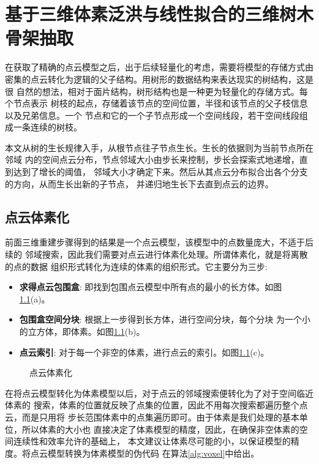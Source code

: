 \chapter{基于三维体素泛洪与线性拟合的三维树木骨架抽取}
\label{sec:sklextract}
在获取了精确的点云模型之后，出于后续轻量化的考虑，需要将模型的存储方式由
密集的点云转化为逻辑的父子结构。用树形的数据结构来表达现实的树结构，这是很
自然的想法，相对于面片结构，树形结构也是一种更为轻量化的存储方式。每个节点表示
树枝的起点，存储着该节点的空间位置，半径和该节点的父子枝信息以及兄弟信息。一个
节点和它的一个子节点形成一个空间线段，若干空间线段组成一条连续的树枝。

本文从树的生长规律入手，从根节点往子节点生长。生长的依据则为当前节点所在邻域
内的空间点云分布，节点邻域大小由步长来控制，步长会探索式地递增，直到达到了增长的阈值，
邻域大小才确定下来。然后从其点云分布拟合出各个分支的方向，从而生长出新的子节点，
并递归地生长下去直到点云的边界。

\section{点云体素化}
前面三维重建步骤得到的结果是一个点云模型，该模型中的点数量庞大，不适于后续的
邻域搜索，因此我们需要对点云进行体素化处理。所谓体素化，就是将离散的点的数据
组织形式转化为连续的体素的组织形式。它主要分为三步:\\

\begin{itemize}
	\item \textbf{求得点云包围盒}: 即找到包围点云模型中所有点的最小的长方体。如图
		\ref{fig:voxel}(a)。
	\item \textbf{包围盒空间分块}: 根据上一步得到长方体，进行空间分块，每个分块
		为一个小的立方体，即体素。如图\ref{fig:voxel}(b)。
	\item \textbf{点云索引}: 对于每一个非空的体素，进行点云的索引。如图\ref{fig:voxel}(c)。
\end{itemize}

\begin{figure}[H]
	\centering
	\hfill
	\hfill
	\caption{点云体素化}
	\label{fig:voxel}
\end{figure}

在将点云模型转化为体素模型以后，对于点云的邻域搜索便转化为了对于空间临近体素的
搜索，体素的位置就反映了点集的位置，因此不用每次搜索都遍历整个点云，而是只用将
步长范围体素中的点集遍历即可。由于体素是我们处理的基本单位，所以体素的大小也
直接决定了体素模型的精度，因此，在确保非空体素的空间连续性和效率允许的基础上，
本文建议让体素尽可能的小，以保证模型的精度。将点云模型转换为体素模型的伪代码
在算法\ref{alg:voxel}中给出。


